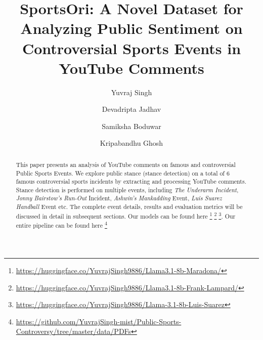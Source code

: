 \documentclass[sigconf, review]{acmart}
\begin{document}

\title{SportsOri: A Novel Dataset for Analyzing Public Sentiment on Controversial Sports Events in YouTube Comments}




\author{Yuvraj Singh}


\author{Devadripta Jadhav}

\author{Samiksha Boduwar}




\author{Kripabandhu Ghosh}
\renewcommand{\shortauthors}{Singh et al.}

\begin{abstract}
  This paper presents an analysis of YouTube comments on famous and controversial Public Sports Events. We explore public stance (stance detection) on a total of 6 famous controversial sports incidents by extracting and processing YouTube comments. Stance detection is performed on multiple events, including \textit{The Underarm Incident}, \textit{Jonny Bairstow's Run-Out} Incident, \textit{Ashwin's Mankadding} Event, \textit{Luis Suarez Handball} Event etc. 
The complete event details,  results and evaluation metrics will be discussed in detail in subsequent sections.
Our models can be found here \footnote{\url{https://huggingface.co/YuvrajSingh9886/Llama3.1-8b-Maradona/}} \footnote{\url{https://huggingface.co/YuvrajSingh9886/Llama3.1-8b-Frank-Lampard/}} \footnote{\url{https://huggingface.co/YuvrajSingh9886/Llama-3.1-8b-Luis-Suarez}}. Our entire pipeline can be found here \footnote{\url{https://github.com/YuvrajSingh-mist/Public-Sports-Controversy/tree/master/data/PDFs}}
       
  

\end{abstract}
\end{document}
